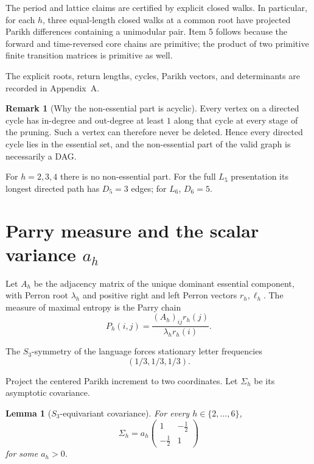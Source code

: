 \documentclass[12pt]{article}
\newtheorem{lemma}[theorem]{Lemma}
\theoremstyle{definition}
\newtheorem{remark}[theorem]{Remark}
\begin{document}
The period and lattice claims are certified by explicit closed walks. In particular, for each \(h\), three equal-length closed walks at a common root have projected Parikh differences containing a unimodular pair. Item 5 follows because the forward and time-reversed core chains are primitive; the product of two primitive finite transition matrices is primitive as well.

The explicit roots, return lengths, cycles, Parikh vectors, and determinants are recorded in Appendix~A.

\begin{remark}[Why the non-essential part is acyclic]
\label{rem:acyclic}
Every vertex on a directed cycle has in-degree and out-degree at least \(1\) along that cycle at every stage of the pruning. Such a vertex can therefore never be deleted. Hence every directed cycle lies in the essential set, and the non-essential part of the valid graph is necessarily a DAG.

For \(h=2,3,4\) there is no non-essential part. For the full \(L_5\) presentation its longest directed path has \(D_5=3\) edges; for \(L_6\), \(D_6=5\).
\end{remark}

\section{Parry measure and the scalar variance \texorpdfstring{\(a_h\)}{a\_h}}
\label{sec:parry}

Let \(A_h\) be the adjacency matrix of the unique dominant essential component, with Perron root \(\lambda_h\) and positive right and left Perron vectors \(r_h,\ell_h\). The measure of maximal entropy is the Parry chain
\[
P_h(i,j)
=
\frac{(A_h)_{ij}r_h(j)}{\lambda_h r_h(i)}.
\]

The \(S_3\)-symmetry of the language forces stationary letter frequencies
\[
(1/3,1/3,1/3).
\]

Project the centered Parikh increment to two coordinates. Let \(\Sigma_h\) be its asymptotic covariance.

\begin{lemma}[\(S_3\)-equivariant covariance]
\label{lem:s3cov}
For every \(h\in\{2,\ldots,6\}\),
\[
\Sigma_h
=
a_h
\begin{pmatrix}
1&-\frac12\\
-\frac12&1
\end{pmatrix}
\]
for some \(a_h>0\).
\end{lemma}
\end{document}

